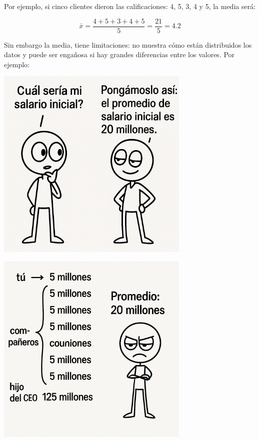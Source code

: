 \documentclass[
  spanish,
  letterpaper,
  DIV=11,
  numbers=noendperiod]{scrreprt}
\begin{document}
Por ejemplo, si cinco clientes dieron las calificaciones: 4, 5, 3, 4 y
5, la media será:

\begin{tcolorbox}[enhanced jigsaw, bottomrule=.15mm, colframe=quarto-callout-tip-color-frame, breakable, colback=white, leftrule=.75mm, left=2mm, arc=.35mm, toprule=.15mm, opacityback=0, rightrule=.15mm]
\begin{minipage}[t]{5.5mm}
\textcolor{quarto-callout-tip-color}{\faLightbulb}
\end{minipage}%
\begin{minipage}[t]{\textwidth - 5.5mm}

\[
\bar{x} = \frac{4 + 5 + 3 + 4 + 5}{5} = \frac{21}{5} = 4.2
\]

\end{minipage}%
\end{tcolorbox}

Sin embargo la media, tiene limitaciones: no muestra cómo están
distribuidos los datos y puede ser engañosa si hay grandes diferencias
entre los valores. Por ejemplo:

\begin{center}
\includegraphics[width=3.64583in,height=\textheight,keepaspectratio]{img/media_1.png}
\end{center}

\begin{center}
\includegraphics[width=3.64583in,height=\textheight,keepaspectratio]{img/media_2.png}
\end{center}
\end{document}
